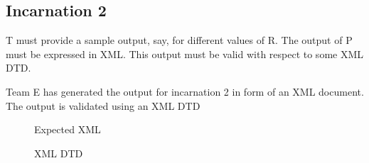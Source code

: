   \subsection{Incarnation 2}
  \begin{flushleft}
    T must provide a sample output, say, for different values of R. The output of P must be expressed in XML. This output must be valid with respect to some XML DTD.
  \end{flushleft}
  \begin{flushleft}
    Team E has generated the output for incarnation 2 in form of an XML document. The output is validated using an XML DTD
  \end{flushleft}
  \begin{figure}[h!]
    \centering
    \caption{Expected XML}
    \label{fig:XML output}
  \end{figure}
  \begin{figure}[h!]
    \centering
    \caption{XML DTD}
    \label{fig:XML DTD}
  \end{figure}
 
